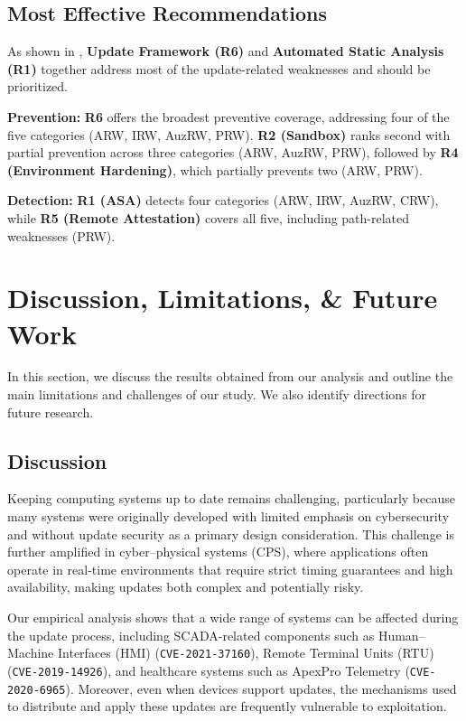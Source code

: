 \documentclass[fleqn,s1,names,tex]{neptune}
\begin{document}
\subsection{Most Effective Recommendations}

As shown in , \textbf{Update Framework (R6)} and \textbf{Automated Static Analysis (R1)} together address most of the update-related weaknesses and should be prioritized.



\cvpt\textbf{Prevention:}
\textbf{R6} offers the broadest preventive coverage, addressing four of the five categories (ARW, IRW, AuzRW, PRW).
\textbf{R2 (Sandbox)} ranks second with partial prevention across three categories (ARW, AuzRW, PRW), followed by \textbf{R4 (Environment Hardening)}, which partially prevents two (ARW, PRW).



\cvpt\textbf{Detection:}
\textbf{R1 (ASA)} detects four categories (ARW, IRW, AuzRW, CRW), while \textbf{R5 (Remote Attestation)}  covers all five, including path-related weaknesses (PRW).


\section{Discussion, Limitations, \& Future Work }
In this section, we discuss the results obtained from our analysis and outline the main limitations and challenges of our study. 
We also identify directions for future research.


\subsection{Discussion}






Keeping computing systems up to date remains challenging, particularly because many systems were originally developed with limited emphasis on cybersecurity and without update security as a primary design consideration. 
This challenge is further amplified in cyber--physical systems (CPS), where applications often operate in real-time environments that require strict timing guarantees and high availability, making updates both complex and potentially risky.



Our empirical analysis shows that a wide range of systems can be affected during the update process, including SCADA-related components such as Human--Machine Interfaces (HMI) (\texttt{CVE-2021-37160}), Remote Terminal Units (RTU) (\texttt{CVE-2019-14926}), and healthcare systems such as ApexPro Telemetry (\texttt{CVE-2020-6965}). 
Moreover, even when devices support updates, the mechanisms used to distribute and apply these updates are frequently vulnerable to exploitation.
\end{document}

